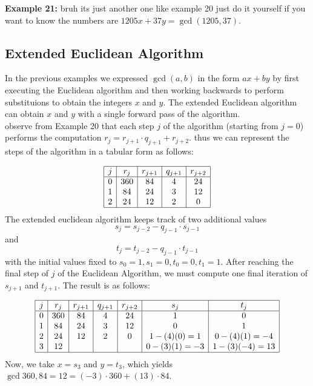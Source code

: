 \documentclass[12pt]{article}
\begin{document}
\vspace{10mm}

\noindent\textbf{Example 21:} bruh its just another one like example 20 just do it yourself if you want to know the numbers are $1205x + 37y = \gcd(1205,37)$.

\newpage
\subsection{Extended Euclidean Algorithm}
In the previous examples we expressed $\gcd(a,b)$ in the form $ax+by$ by first executing the Euclidean algorithm and then working backwards to perform substituions to obtain the integers $x$ and $y$. The extended Euclidean algorithm can obtain $x$ and $y$ with a single forward pass of the algorithm.
\\
observe from Example 20 that each step $j$ of the algorithm (starting from $j=0$) performs the computation 
$r_j = r_{j+1} \cdot q_{j+1} + r_{j+2}$. thus we can represent the steps of the algorithm in a tabular form as follows:


\[
\begin{array}{|c|c|c|c|c|}
\hline
j & r_j & r_{j+1} & q_{j+1} & r_{j+2} \\
\hline
0 & 360 & 84 & 4 & 24 \\
1 & 84 & 24 & 3 & 12 \\
2 & 24 & 12 & 2 & 0 \\
\hline
\end{array}
\]
The extended euclidean algorithm keeps track of two additional values \[s_j = s_{j-2} - q_{j-1} \cdot s_{j-1}\]
and \[t_j = t_{j-2} - q_{j-1} \cdot t_{j-1}\]
with the initial values fixed to $s_0 = 1, s_1 = 0, t_0 = 0, t_1 = 1$. After reaching the final step of $j$ of the Euclidean Algorithm, we must compute one final iteration of $s_{j+1}$ and $t_{j+1}$.
The result is as follows:

\[
\begin{array}{|c|c|c|c|c|c|c|}
\hline
j & r_j & r_{j+1} & q_{j+1} & r_{j+2} & s_j & t_j \\
\hline
0 & 360 & 84 & 4 & 24 & 1 & 0 \\
1 & 84 & 24 & 3 & 12 & 0 & 1 \\
2 & 24 & 12 & 2 & 0 & 1-(4)(0) = 1 & 0-(4)(1) = -4 \\
3 & 12 &  &  &  & 0-(3)(1) =-3 & 1-(3)(-4) = 13 \\
\hline
\end{array}
\]
Now, we take $x=s_3$ and $y=t_3$, which yields $\gcd{360,84} = 12 = (-3) \cdot 360 + (13) \cdot 84$.
\end{document}
